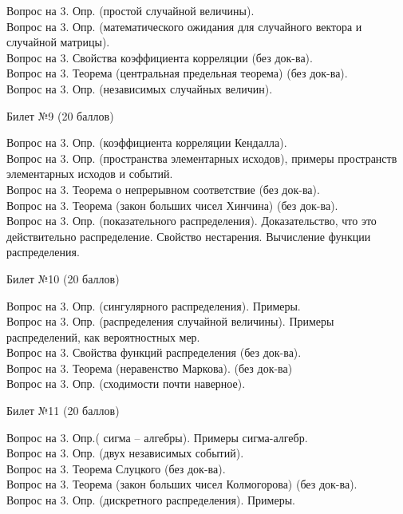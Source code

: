 \documentclass[preview]{standalone}
\begin{document}
Вопрос на 3.  Опр. (простой случайной величины). \\
Вопрос на 3.  Опр. (математического ожидания для случайного вектора и случайной матрицы). \\
Вопрос на 3.  Свойства коэффициента корреляции (без док-ва). \\
Вопрос на 3.  Теорема (центральная предельная теорема) (без док-ва). \\
Вопрос на 3.  Опр. (независимых случайных величин). \\
\begin{center} {\Large Билет №9 (20 баллов)} \end{center}
Вопрос на 3.  Опр. (коэффициента корреляции Кендалла). \\
Вопрос на 3.  Опр. (пространства элементарных исходов), примеры пространств элементарных исходов и событий. \\
Вопрос на 3.  Теорема о непрерывном соответствие (без док-ва). \\
Вопрос на 3. Теорема (закон больших чисел Хинчина) (без док-ва). \\
Вопрос на 3.  Опр. (показательного распределения). Доказательство, что это действительно распределение. Свойство нестарения. Вычисление функции распределения.  \\  
\begin{center} {\Large Билет №10 (20 баллов)} \end{center}
Вопрос на 3.  Опр. (сингулярного распределения). Примеры. \\
Вопрос на 3.  Опр. (распределения случайной величины). Примеры распределений, как вероятностных мер. \\
Вопрос на 3.  Свойства функций распределения (без док-ва). \\
Вопрос на 3.  Теорема (неравенство Маркова). (без док-ва) \\
Вопрос на 3.  Опр. (сходимости почти наверное). \\
\begin{center} {\Large Билет №11 (20 баллов)} \end{center}
Вопрос на 3.  Опр.( сигма – алгебры). Примеры сигма-алгебр. \\
Вопрос на 3.  Опр. (двух независимых событий). \\
Вопрос на 3.  Теорема Слуцкого (без док-ва). \\
Вопрос на 3. Теорема (закон больших чисел Колмогорова) (без док-ва). \\
Вопрос на 3.  Опр. (дискретного распределения). Примеры. \\
\end{document}

